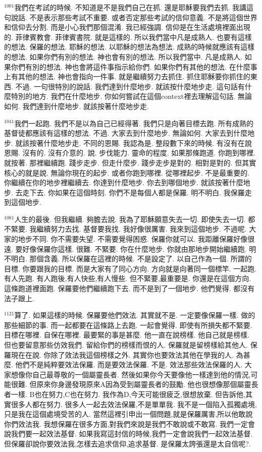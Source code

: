 \documentclass{book}
\begin{document}
$^{1001}$我們在考試的時候.
不知道是不是我們自己在抓.
還是耶穌要我們去抓.
我講這句說話.
不是表示那些考試不重要.
或者否定那些考試的信仰意義.
不是將這個世界和信仰去分割.
而是小心我們那個混淆.
我已經強調.
信仰是在生活處境裡面出現的.
菲律賓教會.
菲律賓書院.
就是這樣的.
所以我們當中凡是成熟人.
也要有這樣的想法.
保羅的想法.
耶穌的想法.
以耶穌的想法為想法.
成熟的時候就應該有這樣的想法.
如果你們有別的想法.
神也會有別的想法.
所以我們當中.
凡是成熟人.
如果你們有別的想法.
神也會將這件事指示給你們.
如果你們有其他的想法.
在什麼事上有其他的想法.
神也會指向一件事.
就是繼續努力去抓住.
抓住耶穌要你抓住的東西.
不過.
一句很特別的說話.
我們達到什麼地步.
就該按什麼地步走.
這句話有什麼特別的地方.
我們在什麼地步.
你如何嘗試在這個context裡去理解這句話.
無論如何.
我們達到什麼地步.
就該按著什麼地步走.

$^{1041}$我們一起跑.
我們不是以為自己已經得著.
我們只是向著目標去跑.
所有成熟的基督徒都應該有這樣的想法.
不過.
大家去到什麼地步.
無論如何.
大家去到什麼地步.
就該按著什麼地步走.
不同的恩賜.
我認為是.
整段數下來的時候.
有沒有在說恩賜.
沒有的.
沒有介意的.
說.
步伐能力.
靈命的程度.
如果那條跑道.
你跑到哪裡.
就按著.
那裡繼續跑.
踐步走步.
但走什麼步.
踐步走步是對的.
相對是對的.
但其實核心的就是說.
無論你現在的起步.
或者你跑到哪裡.
從哪裡起步.
不是最重要的.
你繼續在你的地步裡繼續去.
你達到什麼地步.
你去到哪個地步.
就該按著什麼地步.
去走下去.
你如果在這個時刻.
你們不是每個人都是保羅.
明不明白.
我保羅走到這個地步.

$^{1081}$人生的最後.
但我繼續.
夠膽去說.
我為了耶穌願意失去一切.
即使失去一切.
都不緊要.
我繼續努力去找.
基督要我找.
我好像很厲害.
我來到這個地步.
不過呢.
大家的地步不同.
你不需要失望.
不需要覺得困惑.
保羅你就可以.
我距離保羅好像很遠.
要好像保羅你這樣.
很難.
不緊要.
你在什麼地步.
你就由那地步開始繼續跑.
明不明白.
那個含義.
所以保羅在這裡的時候.
不是設定了.
以自己作為一個.
所謂的目標.
你要跟我的目標.
而是大家有了同心方向.
方向就是向著同一個標竿.
一起跑.
有人先跑.
有人跑後,有人快些,有人慢些.
但不緊要,最重要是.
你還是在這個方向.
這條跑道裡面跑.
保羅要他們繼續跑下去.
而不是到了一個地步.
他們覺得.
都沒有法子跟上.

$^{1121}$算了.
如果這樣的時候.
保羅要他們效法.
其實就不是.
一定要像保羅一樣.
做的那些細節的事.
而一起都要在這條路上去跑.
一起會覺得.
即使有所損失都不緊要.
目標在哪裡.
自保在哪裡.
最要緊的事是甚麼.
他一直在說榜樣.
他自己就是榜樣.
但也要留意那些仿效我們.
留給你們的榜樣而恨的人.
保羅就是留榜樣給其他人.
保羅現在在說.
你除了效法我這個榜樣之外.
其實你也要效法其他在學我的人.
為甚麼.
他們不是純粹要效法保羅.
而是要效法保羅.
不是.
效法那些效法保羅的人.
大家想像你自己最尊敬的一個屬靈長者.
然後如果你今天要像他一樣達到他的情況,可能很難.
但原來你身邊發現原來A因為受到屬靈長者的鼓勵.
他也很想像那個屬靈長者一樣.
B也在努力,C也在努力.
我作為D,今天可能很疲乏,很想放棄.
但告訴他,其實很多人都在努力.
很多人一起去效法保羅,不是單單我.
我不是一個陷入孤獨處境,只是我在這個處境受苦的人.
當然這裡引申出一個問題,就是保羅厲害,所以他敢說你們效法我.
我想保羅在很多方面,對我們來說是我們不敢說或不敢寫.
我們一定會說我們要一起效法基督.
如果我寫這封信的時候,我們一定會說我們一起效法基督.
但保羅卻說你要效法我,怎樣去追求信仰,追求基督.
是保羅太誇張還是太自信呢?.
\end{document}
